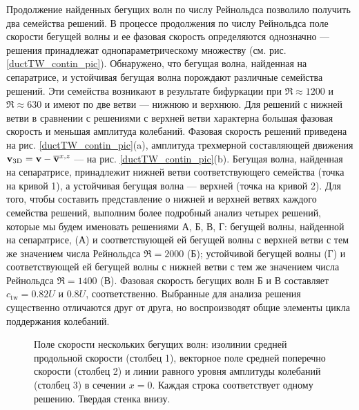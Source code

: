 Продолжение найденных бегущих волн по числу Рейнольдса позволило получить два семейства решений. В процессе продолжения по числу Рейнольдса поле скорости бегущей волны и ее фазовая скорость определяются однозначно --- решения принадлежат однопараметрическому множеству (см. рис. \ref{ductTW_contin_pic}). Обнаружено, что бегущая волна, найденная на сепаратрисе, и устойчивая бегущая волна порождают различные семейства решений. Эти семейства возникают в результате бифуркации при $\Re \approx 1200$ и $\Re \approx 630$ и имеют по две ветви --- нижнюю и верхнюю. Для решений с нижней ветви в сравнении с решениями с верхней ветви характерна большая фазовая скорость и меньшая амплитуда колебаний. Фазовая скорость решений приведена на рис. \ref{ductTW_contin_pic}(a), амплитуда трехмерной составляющей движения $\mathbf{v}_\mathrm{3D} = \mathbf{v} - \overline{\mathbf{v}}^{x,z}$ ---  на рис. \ref{ductTW_contin_pic}(b). Бегущая волна, найденная на сепаратрисе, принадлежит нижней ветви соответствующего семейства (точка на кривой 1), а устойчивая бегущая волна --- верхней (точка на кривой 2). Для того, чтобы составить представление о нижней и верхней ветвях каждого семейства решений, выполним более подробный анализ четырех решений, которые мы будем именовать решениями А, Б, В, Г: бегущей волны, найденной на сепаратрисе, (А) и соответствующей ей бегущей волны с верхней ветви с тем же значением числа Рейнольдса $\Re = 2000$ (Б); устойчивой бегущей волны (Г) и соответствующей ей бегущей волны с нижней ветви с тем же значением числа Рейнольдса $\Re = 1400$ (В). Фазовая скорость бегущих волн Б и В составляет $c_\mathrm{tw} = 0.82U$ и $0.8U$, соответственно. Выбранные для анализа решения существенно отличаются друг от друга, но воспроизводят общие элементы цикла поддержания колебаний. 

\begin{figure}
\caption{Поле скорости нескольких бегущих волн: изолинии средней продольной скорости (столбец 1), векторное поле средней поперечно скорости (столбец 2) и линии равного уровня амплитуды колебаний (столбец 3) в сечении $x = 0$. Каждая строка соответствует одному решению. Твердая стенка внизу.} 
\label{ductTW_means_pic}
\end{figure}

